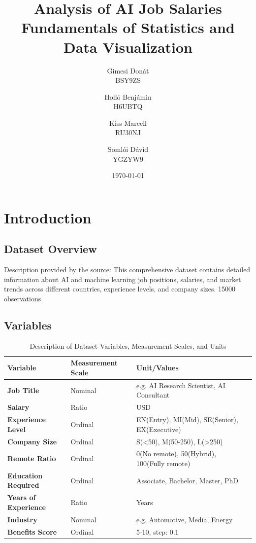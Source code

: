 \documentclass[12pt, a4paper, titlepage]{article}
\title{
    Analysis of AI Job Salaries \\
    \large Fundamentals of Statistics and Data Visualization
}
\author{
    Gimesi Donát \\ BSY9ZS
    \and Holló Benjámin \\ H6UBTQ
    \and Kiss Marcell \\ RU30NJ
    \and Somlói Dávid \\ YGZYW9
}
\date{\today}
\begin{document}
\maketitle

\section{Introduction}
\subsection{Dataset Overview}
Description provided by the \href{https://www.kaggle.com/datasets/bismasajjad/global-ai-job-market-and-salary-trends-2025}{\underline{source}}: This comprehensive dataset contains detailed information about AI and machine learning job positions, salaries, and market trends across different countries, experience levels, and company sizes. 15000 observations
\subsection{Variables}
\begin{table}[htbp]
    \centering
    \caption{Description of Dataset Variables, Measurement Scales, and Units}
    \label{tab:variables}
    \begin{tabular}{llll}
        \toprule
        \textbf{Variable}            & \textbf{Measurement Scale} & \textbf{Unit/Values}                          \\
        \midrule
        \textbf{Job Title}           & Nominal                    & e.g. AI Research Scientist, AI Consultant     \\
        \textbf{Salary}              & Ratio                      & USD                                           \\
        \textbf{Experience Level}    & Ordinal                    & EN(Entry), MI(Mid), SE(Senior), EX(Executive) \\
        \textbf{Company Size}        & Ordinal                    & S(<50), M(50-250), L(>250)                    \\
        \textbf{Remote Ratio}        & Ordinal                    & 0(No remote), 50(Hybrid), 100(Fully remote)   \\
        \textbf{Education Required}  & Ordinal                    & Associate, Bachelor, Master, PhD              \\
        \textbf{Years of Experience} & Ratio                      & Years                                         \\
        \textbf{Industry}            & Nominal                    & e.g. Automotive, Media, Energy                \\
        \textbf{Benefits Score}      & Ordinal                    & 5-10, step: 0.1                               \\
        \bottomrule
    \end{tabular}
\end{table}
\end{document}
